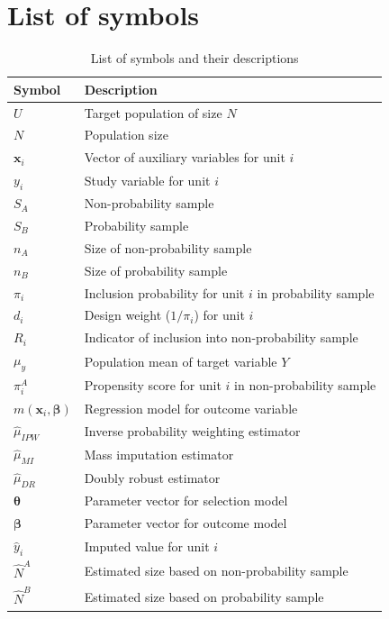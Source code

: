 \documentclass[
]{jss}
\begin{document}
\clearpage

\appendix

\section{List of symbols}\label{list-of-symbols}

\begin{table}[ht!]
\centering
\begin{tabular}{ll}
\hline
\textbf{Symbol} & \textbf{Description} \\
\hline
$U$ & Target population of size $N$ \\
$N$ & Population size \\
$\boldsymbol{x}_i$ & Vector of auxiliary variables for unit $i$ \\
$y_i$ & Study variable for unit $i$ \\
$S_A$ & Non-probability sample \\
$S_B$ & Probability sample \\
$n_A$ & Size of non-probability sample \\
$n_B$ & Size of probability sample \\
$\pi_i$ & Inclusion probability for unit $i$ in probability sample \\
$d_i$ & Design weight ($1/\pi_i$) for unit $i$ \\
$R_i$ & Indicator of inclusion into non-probability sample \\
$\mu_y$ & Population mean of target variable $Y$ \\
$\pi_i^A$ & Propensity score for unit $i$ in non-probability sample \\
$m(\boldsymbol{x}_i, \boldsymbol{\beta})$ & Regression model for outcome variable \\
$\hat{\mu}_{IPW}$ & Inverse probability weighting estimator \\
$\hat{\mu}_{MI}$ & Mass imputation estimator \\
$\hat{\mu}_{DR}$ & Doubly robust estimator \\
$\boldsymbol{\theta}$ & Parameter vector for selection model \\
$\boldsymbol{\beta}$ & Parameter vector for outcome model \\
$\hat{y}_i$ & Imputed value for unit $i$ \\
$\hat{N}^A$ & Estimated size based on non-probability sample \\
$\hat{N}^B$ & Estimated size based on probability sample \\
\hline
\end{tabular}
\caption{List of symbols and their descriptions}
\label{tab-list-of-sybmols}
\end{table}
\end{document}
